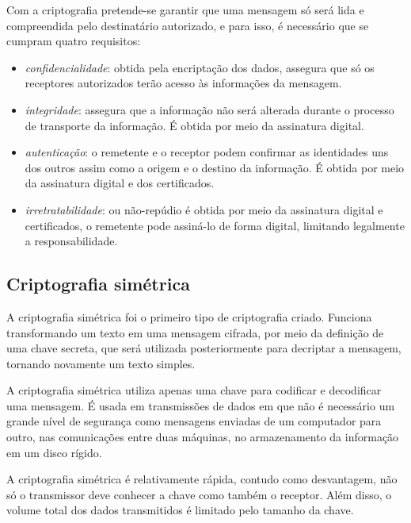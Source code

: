 Com a criptografia pretende-se garantir que uma mensagem só será lida e compreendida pelo destinatário autorizado, e para isso, é necessário que se cumpram quatro requisitos:

\begin{itemize}
\item \textit{confidencialidade}: obtida pela encriptação dos dados, assegura que só os receptores autorizados terão acesso às informações da mensagem.
\item \textit{integridade}: assegura que a informação não será alterada durante o processo de transporte da informação. É obtida por meio da assinatura digital.
\item \textit{autenticação}: o remetente e o receptor podem confirmar as identidades uns dos outros assim como a origem e o destino da informação. É obtida por meio da assinatura digital e dos certificados.
\item \textit{irretratabilidade}: ou não-repúdio é obtida por meio da assinatura digital e certificados, o remetente pode assiná-lo de forma digital, limitando legalmente a responsabilidade.
\end{itemize}

%
%
\subsection{Criptografia simétrica}
A criptografia simétrica foi o primeiro tipo de criptografia criado. Funciona transformando um texto em uma mensagem cifrada, por meio da definição de uma chave secreta, que será utilizada posteriormente para decriptar a mensagem, tornando novamente um texto simples. \cite{Cavalcante:2015}

A criptografia simétrica utiliza apenas uma chave para codificar e decodificar uma mensagem. É usada em transmissões de dados em que não é necessário um grande nível de segurança como mensagens enviadas de um computador para outro, nas comunicações entre duas máquinas, no armazenamento da informação em um disco rígido.

A criptografia simétrica é relativamente rápida, contudo como desvantagem, não só o transmissor deve conhecer a chave como também o receptor. Além disso, o volume total dos dados transmitidos é limitado pelo tamanho da chave.

%
%
